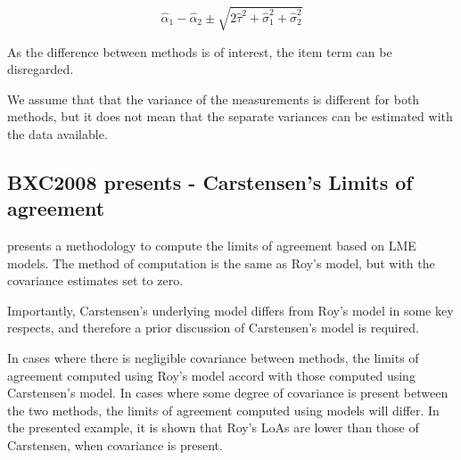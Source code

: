 \documentclass[12pt, a4paper]{report}
\theoremstyle{plain}
\theoremstyle{definition}
\theoremstyle{remark}
\begin{document}
\[
\hat{\alpha}_1 - \hat{\alpha}_2 \pm \sqrt{2 \hat{\tau}^2 +
	\hat{\sigma}^2_1 + \hat{\sigma}^2_2}
\]
\newpage



As the difference between methods is of interest, the item term can be disregarded.

We assume that that the variance of the measurements is different for both methods, but it does not mean that the separate variances can be estimated with the data available.\\





	
	
	
	

\subsection{BXC2008 presents - Carstensen's Limits of agreement}
\citet{BXC2008} presents a methodology to compute the limits of agreement based on LME models. The method of computation is the same as Roy's model, but with the covariance estimates set to zero.

Importantly, Carstensen's underlying model differs from Roy's model in some key respects, and therefore a prior discussion of Carstensen's model is required.

In cases where there is negligible covariance between methods, the limits of agreement computed using Roy's model accord with those computed using Carstensen's model. In cases where some degree of
covariance is present between the two methods, the limits of agreement computed using models will differ. In the presented example, it is shown that Roy's LoAs are lower than those of Carstensen, when covariance is present.
\end{document}
